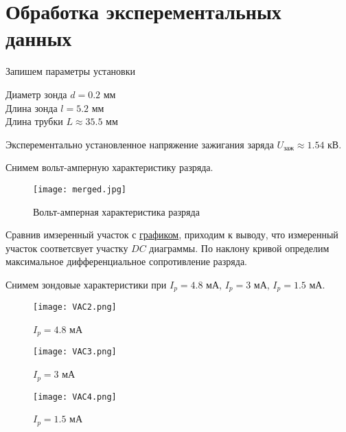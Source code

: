     \section{Обработка эксперементальных данных}

    Запишем параметры установки
    \begin{center}
        Диаметр зонда $d = 0.2$ мм \\
        Длина зонда $l = 5.2$ мм \\
        Длина трубки $L \approx 35.5$ мм \\
    \end{center}

    Эксперементально установленное напряжение зажигания заряда $U_{\text{заж}} \approx 1.54$ кВ.

    Снимем вольт-амперную характеристику разряда.

    \begin{figure}
        \centering
        \texttt{[image: merged.jpg]}
        \caption{Вольт-амперная характеристика разряда}
        \label{diagram}
    \end{figure}

    Сравнив имзеренный участок с \hyperref[diagram]{графиком}, приходим к выводу, что измеренный участок
    соответсвует участку $DC$ диаграммы. По наклону кривой определим максимальное
    дифференциальное сопротивление разряда.

    \begin{center}
    \end{center}

    Снимем зондовые характеристики при $I_p = 4.8$ мА, $I_p = 3$ мА, $I_p = 1.5$ мА.

    \begin{figure}
        \centering
        \texttt{[image: VAC2.png]}
        \caption{$I_p = 4.8$ мА}
    \end{figure}

    \begin{figure}
        \centering
        \texttt{[image: VAC3.png]}
        \caption{$I_p = 3$ мА}
    \end{figure}

    \begin{figure}
        \centering
        \texttt{[image: VAC4.png]}
        \caption{$I_p = 1.5$ мА}
    \end{figure}

